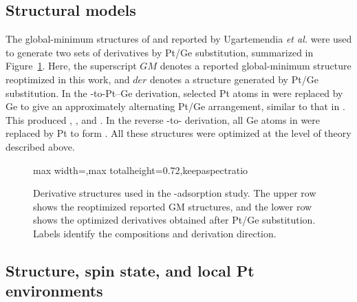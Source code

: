 
\subsection{Structural models}

The global-minimum structures of  and  reported by Ugartemendia \textit{et al.}\cite{ugartemendia:2022} were used to generate two sets of derivatives by Pt/Ge substitution, summarized in Figure~\ref{fig:crossed_models}. Here, the superscript $GM$ denotes a reported global-minimum structure reoptimized in this work, and $der$ denotes a structure generated by Pt/Ge substitution. In the -to-Pt--Ge derivation,
selected Pt atoms in  were replaced by Ge to give an approximately alternating Pt/Ge arrangement, similar to that in . This produced , , and . In the reverse -to- derivation, all Ge atoms in  were replaced by Pt to form . All these
structures were optimized at the level of theory described above.


\begin{figure}[htbp]
\centering
\begin{adjustbox}{max width=\linewidth,max totalheight=0.72\textheight,keepaspectratio}

\end{adjustbox}
\caption{Derivative structures used in the -adsorption study. The upper row shows the reoptimized reported GM structures, and the lower row shows the optimized derivatives obtained after Pt/Ge substitution. Labels identify the compositions and derivation direction.}
\label{fig:crossed_models}
\end{figure}

\subsection{Structure, spin state, and local Pt environments}



